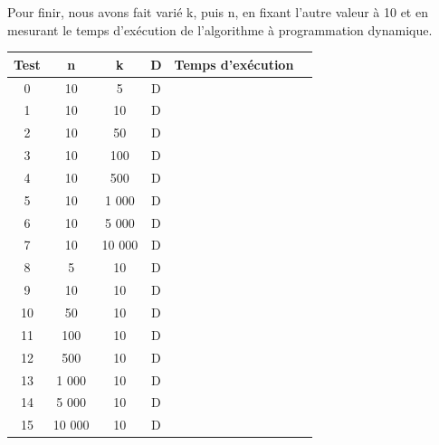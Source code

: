 \documentclass[a4paper, titlepage]{article}
\begin{document}
		Pour finir, nous avons fait varié k, puis n, en fixant l'autre valeur à 10 et en mesurant le temps d'exécution de l'algorithme à programmation dynamique.
		
		\begin{center}
		\begin{tabular}{|c|c|c|c|r|r|}
			\hline
			Test	& n	& k	& D	& Temps d'exécution \\
			\hline
			0		& 10 & 5 & D & \\
			1		& 10 & 10 & D & \\
			2		& 10 & 50 & D & \\
			3		& 10 & 100 & D & \\
			4		& 10 & 500 & D & \\
			5		& 10 & 1 000 & D & \\
			6		& 10 & 5 000 & D & \\
			7		& 10 & 10 000 & D & \\
			\hline
			8		& 5 & 10 & D & \\
			9		& 10 & 10 & D & \\
			10		& 50 & 10 & D & \\
			11		& 100 & 10 & D & \\
			12		& 500 & 10 & D & \\
			13		& 1 000 & 10 & D & \\
			14		& 5 000 & 10 & D & \\
			15		& 10 000 & 10 & D & \\
			\hline
		\end{tabular}
		\end{center}
		
\end{document}
